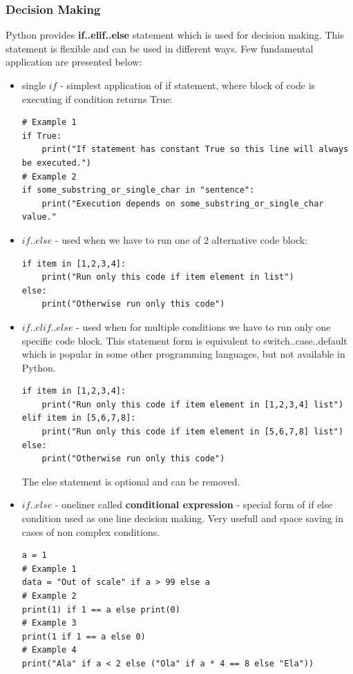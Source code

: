 \documentclass{article}
\begin{document}
	\subsubsection{Decision Making}
	Python provides \textbf{if..elif..else} statement which is used for decision making. This statement is flexible and can be used in different ways. Few fundamental application are presented below:
	\begin{itemize}
	\item single $if$ - simplest application of if statement, where block of code is executing if condition returns True: 
		\begin{lstlisting}[style=pystyle]
# Example 1
if True:
	print("If statement has constant True so this line will always be executed.")
# Example 2
if some_substring_or_single_char in "sentence":
	print("Execution depends on some_substring_or_single_char value."
	\end{lstlisting}
	\item $if..else$ - used when we have to run one of 2 alternative code block:
	\begin{lstlisting}[style=pystyle]
if item in [1,2,3,4]:
	print("Run only this code if item element in list")
else:
	print("Otherwise run only this code")
	\end{lstlisting}
	\item $if..elif..else$ - used when for multiple conditions we have to run only one specific code block. This statement form is equivalent to switch..case..default which is popular in some other programming languages, but not available in Python.
	\begin{lstlisting}[style=pystyle]
if item in [1,2,3,4]:
	print("Run only this code if item element in [1,2,3,4] list")
elif item in [5,6,7,8]:
	print("Run only this code if item element in [5,6,7,8] list")
else:
	print("Otherwise run only this code")
	\end{lstlisting}
	The else statement is optional and can be removed.
	\item $if..else$ - oneliner called \textbf{conditional expression} - special form of if else condition used as one line decision making. Very usefull and space saving in cases of non complex conditions.
	\begin{lstlisting}[style=pystyle]
a = 1
# Example 1
data = "Out of scale" if a > 99 else a
# Example 2
print(1) if 1 == a else print(0)
# Example 3
print(1 if 1 == a else 0)
# Example 4
print("Ala" if a < 2 else ("Ola" if a * 4 == 8 else "Ela"))
	\end{lstlisting}
	\end{itemize}
\end{document}
